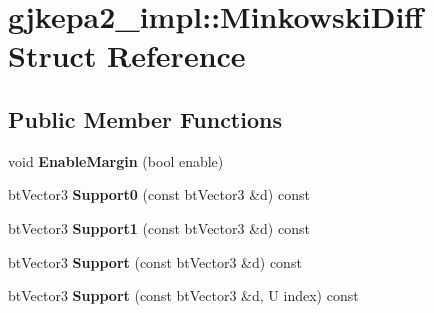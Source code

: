 \hypertarget{structgjkepa2__impl_1_1_minkowski_diff}{\section{gjkepa2\+\_\+impl\+:\+:Minkowski\+Diff Struct Reference}
\label{structgjkepa2__impl_1_1_minkowski_diff}
}
\subsection*{Public Member Functions}
\begin{DoxyCompactItemize}
\item 
\hypertarget{structgjkepa2__impl_1_1_minkowski_diff_a2050c7ca5d9c033d40da2a95ed7efc9d}{void {\bfseries Enable\+Margin} (bool enable)}\label{structgjkepa2__impl_1_1_minkowski_diff_a2050c7ca5d9c033d40da2a95ed7efc9d}

\item 
\hypertarget{structgjkepa2__impl_1_1_minkowski_diff_aeab174424636b4676bb454d6bdef567e}{bt\+Vector3 {\bfseries Support0} (const bt\+Vector3 \&d) const }\label{structgjkepa2__impl_1_1_minkowski_diff_aeab174424636b4676bb454d6bdef567e}

\item 
\hypertarget{structgjkepa2__impl_1_1_minkowski_diff_abb9670f065f5f96c570a932f8e167201}{bt\+Vector3 {\bfseries Support1} (const bt\+Vector3 \&d) const }\label{structgjkepa2__impl_1_1_minkowski_diff_abb9670f065f5f96c570a932f8e167201}

\item 
\hypertarget{structgjkepa2__impl_1_1_minkowski_diff_abc85c35313d9cf02f57ca63f25b9be3a}{bt\+Vector3 {\bfseries Support} (const bt\+Vector3 \&d) const }\label{structgjkepa2__impl_1_1_minkowski_diff_abc85c35313d9cf02f57ca63f25b9be3a}

\item 
\hypertarget{structgjkepa2__impl_1_1_minkowski_diff_a129ead3b7a066d28c64bb4e4fcd38834}{bt\+Vector3 {\bfseries Support} (const bt\+Vector3 \&d, U index) const }\label{structgjkepa2__impl_1_1_minkowski_diff_a129ead3b7a066d28c64bb4e4fcd38834}

\end{DoxyCompactItemize}

